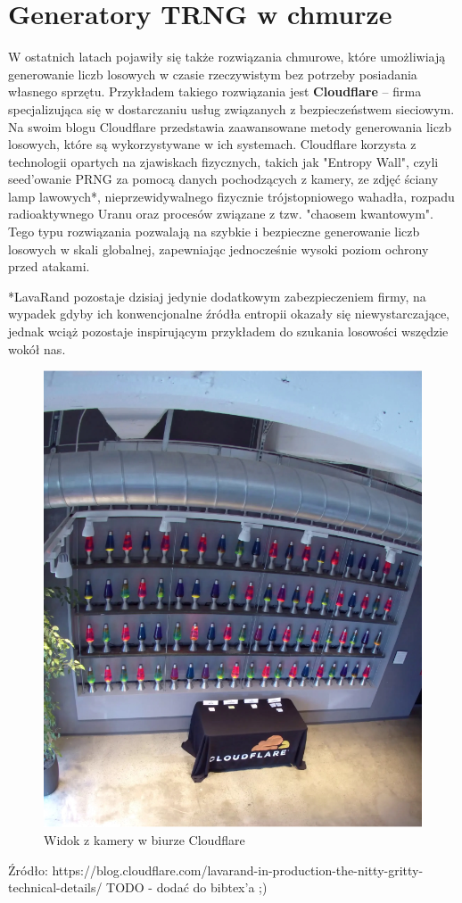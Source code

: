 \section{Generatory TRNG w chmurze}

W ostatnich latach pojawiły się także rozwiązania chmurowe, które umożliwiają generowanie liczb losowych w czasie rzeczywistym bez potrzeby posiadania własnego sprzętu. Przykładem takiego rozwiązania jest \textbf{Cloudflare} – firma specjalizująca się w dostarczaniu usług związanych z bezpieczeństwem sieciowym. Na swoim blogu Cloudflare przedstawia zaawansowane metody generowania liczb losowych, które są wykorzystywane w ich systemach.
Cloudflare korzysta z technologii opartych na zjawiskach fizycznych, takich jak "Entropy Wall", czyli seed'owanie PRNG za pomocą danych pochodzących z kamery, ze zdjęć ściany lamp lawowych*,
nieprzewidywalnego fizycznie trójstopniowego wahadła, rozpadu radioaktywnego Uranu oraz procesów związane z tzw. "chaosem kwantowym".
Tego typu rozwiązania pozwalają na szybkie i bezpieczne generowanie liczb losowych w skali globalnej, zapewniając jednocześnie wysoki poziom ochrony przed atakami.

*LavaRand pozostaje dzisiaj jedynie dodatkowym zabezpieczeniem firmy, na wypadek gdyby ich konwencjonalne źródła entropii okazały się niewystarczające, jednak wciąż pozostaje inspirującym przykładem do szukania losowości wszędzie wokół nas.

\begin{figure}[H]
    \centering
    \includegraphics{chapters/02-teoria/figures/lavarandCamera}
    \caption{Widok z kamery w biurze Cloudflare}
    \label{fig:lavarand}
\end{figure}
Źródło: https://blog.cloudflare.com/lavarand-in-production-the-nitty-gritty-technical-details/
TODO - dodać do bibtex'a ;)

